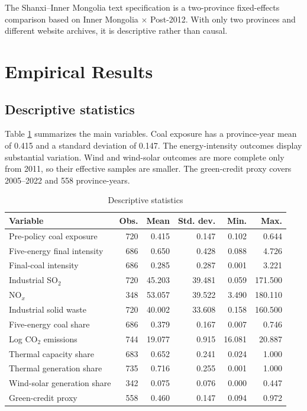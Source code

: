 \documentclass[11pt]{article}
\begin{document}
The Shanxi--Inner Mongolia text specification is a two-province fixed-effects comparison based on Inner Mongolia $\times$ Post-2012. With only two provinces and different website archives, it is descriptive rather than causal.

\section{Empirical Results}

\subsection{Descriptive statistics}

Table \ref{tab:desc} summarizes the main variables. Coal exposure has a province-year mean of 0.415 and a standard deviation of 0.147. The energy-intensity outcomes display substantial variation. Wind and wind-solar outcomes are more complete only from 2011, so their effective samples are smaller. The green-credit proxy covers 2005--2022 and 558 province-years.

\begin{table}[H]
\centering
\caption{Descriptive statistics}
\label{tab:desc}
\begin{tabular}{lrrrrr}
\toprule
Variable & Obs. & Mean & Std. dev. & Min. & Max. \\
\midrule
Pre-policy coal exposure & 720 & 0.415 & 0.147 & 0.102 & 0.644 \\
Five-energy final intensity & 686 & 0.650 & 0.428 & 0.088 & 4.726 \\
Final-coal intensity & 686 & 0.285 & 0.287 & 0.001 & 3.221 \\
Industrial SO$_2$ & 720 & 45.203 & 39.481 & 0.059 & 171.500 \\
NO$_x$ & 348 & 53.057 & 39.522 & 3.490 & 180.110 \\
Industrial solid waste & 720 & 40.002 & 33.608 & 0.158 & 160.500 \\
Five-energy coal share & 686 & 0.379 & 0.167 & 0.007 & 0.746 \\
Log CO$_2$ emissions & 744 & 19.077 & 0.915 & 16.081 & 20.887 \\
Thermal capacity share & 683 & 0.652 & 0.241 & 0.024 & 1.000 \\
Thermal generation share & 735 & 0.716 & 0.255 & 0.001 & 1.000 \\
Wind-solar generation share & 342 & 0.075 & 0.076 & 0.000 & 0.447 \\
Green-credit proxy & 558 & 0.460 & 0.147 & 0.094 & 0.972 \\
\bottomrule
\end{tabular}
\end{table}
\end{document}
